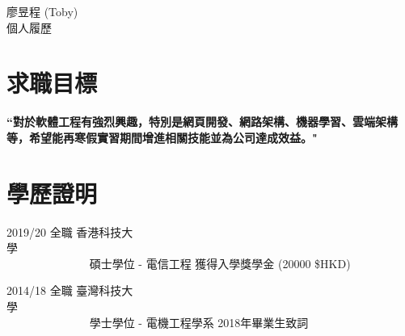 \documentclass[10pt]{article} %
\begin{document}
	
\begin{paracol}{2} %



\parbox[top][0.12\textheight][c]{\linewidth}{ 
	\vspace{-0.04\textheight} %
	\centering %
	{\sffamily\Huge 廖昱程 (Toby)}\\\medskip %
	{\Huge\color{headings} 個人履歷}
}

\section{求職目標}  %
{\raggedright\textbf{``對於軟體工程有強烈興趣，特別是網頁開發、網路架構、機器學習、雲端架構等，希望能再寒假實習期間增進相關技能並為公司達成效益。"}\\\medskip}

\section{學歷證明}
\begin{flushleft}  %

	\workposition
		{2019/20}
		{全職}
		{香港科技大學\ \ \ \ \ \ \ \ \ \ \ \ \ \ \ \ \ \ \ \ \ \ \ \ \ \ \ \ \ \ \ \ \ \ \ \ \ \ \ \ \ \ \ \ \ \ \ \ \ \ \ \ \ \ \ \ \ \ \ \ \ \ \ \ \ \ \ \ \ \ \ \ \ \ \ \ \ \ \ \ \ \ \ \ } 
		{碩士學位 - 電信工程}
		{獲得入學獎學金 (20000 \$HKD)}
	
	\vspace{.25cm}
	\workposition
		{2014/18}
		{全職}
		{臺灣科技大學\ \ \ \ \ \ \ \ \ \ \ \ \ \ \ \ \ \ \ \ \ \ \ \ \ \ \ \ \ \ \ \ \ \ \ \ \ \ \ \ \ \ \ \ \ \ \ \ \ \ \ \ \ \ \ \ \ \ \ \ \ \ \ \ \ \ \ \ \ \ \ \ \ \ \ \ \ \ \ \ \ \ \ \ } 
		{學士學位 - 電機工程學系}
		{2018年畢業生致詞}
	

\end{flushleft}
\end{paracol}
\end{document}
